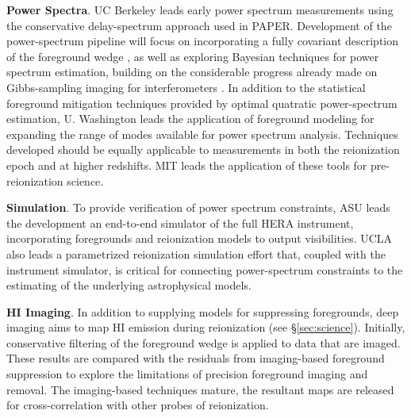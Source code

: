 \documentclass[preprint]{aastex}
\newcommand{\compress}{\vspace{-0.3in}}
\begin{document}


{\bf Power Spectra}. UC Berkeley leads early power spectrum measurements using the conservative
delay-spectrum approach used in PAPER.  %
Development of
the power-spectrum pipeline will focus on incorporating
a fully covariant description of the foreground wedge
\citep{liu_tegmark2011,dillon_et_al2013a}, as well as
exploring Bayesian techniques for power spectrum estimation, building on the considerable
progress already made on Gibbs-sampling imaging for interferometers \citep{sutter_et_al2014}.
In addition to the statistical foreground mitigation techniques provided by optimal quatratic
power-spectrum estimation, U. Washington leads the application of 
foreground modeling for expanding the range of modes available for power spectrum analysis.
Techniques developed should be equally applicable
to measurements in both the reionization epoch and at higher redshifts.  MIT leads the application
of these tools for pre-reionization science.

{\bf Simulation}. To provide verification of power spectrum constraints, ASU leads the
development an end-to-end simulator of the full HERA instrument, incorporating
foregrounds and reionization models to output visibilities.  UCLA also leads
a parametrized reionization simulation effort that, coupled with the instrument
simulator, is critical for connecting power-spectrum constraints to the estimating
of the underlying astrophysical models.


{\bf HI Imaging}. In addition to supplying models for suppressing foregrounds,
deep imaging aims to map HI emission during reionization (see \S\ref{sec:science}).
Initially, conservative filtering of the foreground wedge is applied to data that
are imaged.  These results are compared with the residuals from imaging-based
foreground suppression to explore the limitations of 
precision foreground imaging and removal.  The imaging-based techniques mature, the resultant
maps are released for cross-correlation with other probes of reionization.
\end{document}
